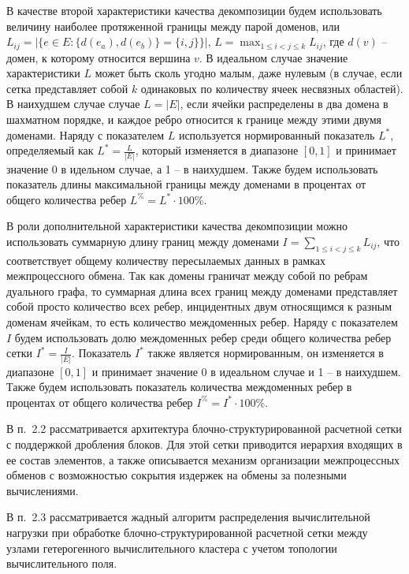\documentclass[a4paper,14pt]{extarticle}                     %
\theoremstyle{plain}                                         %
\begin{document}
В качестве второй характеристики качества декомпозиции будем использовать величину наиболее протяженной границы между парой доменов, или $L_{ij} = \left| \{ e \in E: \{ d(e_a), d(e_b) \} = \{ i, j \} \} \right|$, $L = \max_{1 \le i < j \le k}{L_{ij}}$, где $d(v)$ -- домен, к которому относится вершина $v$.
В идеальном случае значение характеристики $L$ может быть сколь угодно малым, даже нулевым (в случае, если сетка представляет собой $k$ одинаковых по количеству ячеек несвязных областей).
В наихудшем случае случае $L = |E|$, если ячейки распределены в два домена в шахматном порядке, и каждое ребро относится к границе между этими двумя доменами.
Наряду с показателем $L$ используется нормированный показатель $L^{*}$, определяемый как $L^{*} = \frac{L}{|E|}$, который изменяется в диапазоне $[0, 1]$ и принимает значение 0 в идельном случае, а 1 -- в наихудшем.
Также будем использовать показатель длины максимальной границы между доменами в процентах от общего количества ребер $L^{\%} = L^{*} \cdot 100\%$.

В роли дополнительной характеристики качества декомпозиции можно использовать суммарную длину границ между доменами $I = \sum_{1 \le i < j \le k}{L_{ij}}$, что соответствует общему количеству пересылаемых данных в рамках межпроцессного обмена.
Так как домены граничат между собой по ребрам дуального графа, то суммарная длина всех границ между доменами представляет собой просто количество всех ребер, инцидентных двум относящимся к разным доменам ячейкам, то есть количество междоменных ребер.
Наряду с показателем $I$ будем использовать долю междоменных ребер среди общего количества ребер сетки $I^{*} = \frac{I}{|E|}$.
Показатель $I^{*}$ также является нормированным, он изменяется в диапазоне $[0, 1]$ и принимает значение 0 в идеальном случае и 1 -- в наихудшем.
Также будем использовать показатель количества междоменных ребер в процентах от общего количества ребер $I^{\%} = I^{*} \cdot 100\%$.


В п.~2.2 рассматривается архитектура блочно-структурированной расчетной сетки с поддержкой дробления блоков.
Для этой сетки приводится иерархия входящих в ее состав элементов, а также описывается механизм организации межпроцессных обменов с возможностью сокрытия издержек на обмены за полезными вычислениями.


В п.~2.3 рассматривается жадный алгоритм распределения вычислительной нагрузки при обработке блочно-структурированной расчетной сетки между узлами гетерогенного вычислительного кластера с учетом топологии вычислительного поля.
\end{document}
